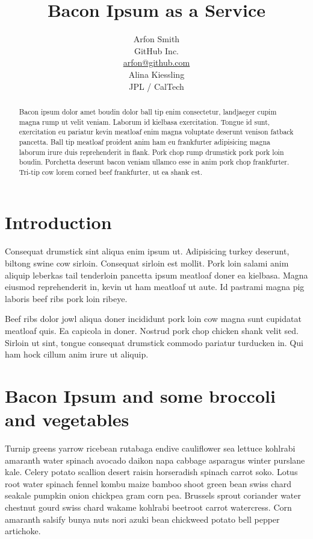 \documentclass[a4paper,10pt]{article}
\title{Bacon Ipsum as a Service \vspace{-0.2cm}}
\author{
Arfon Smith\\
GitHub Inc.\\
\url{arfon@github.com}\\
Alina Kiessling \\
JPL / CalTech
}
\date{}
\begin{document}
\maketitle

\vspace{-1.2cm}
\begin{abstract}

\noindent
Bacon ipsum dolor amet boudin dolor ball tip enim consectetur, landjaeger cupim magna rump ut velit veniam. Laborum id kielbasa exercitation. Tongue id sunt, exercitation eu pariatur kevin meatloaf enim magna voluptate deserunt venison fatback pancetta. Ball tip meatloaf proident anim ham eu frankfurter adipisicing magna laborum irure duis reprehenderit in flank. Pork chop rump drumstick pork pork loin boudin. Porchetta deserunt bacon veniam ullamco esse in anim pork chop frankfurter. Tri-tip cow lorem corned beef frankfurter, ut ea shank est.
\end{abstract}

\section{Introduction}

Consequat drumstick sint aliqua enim ipsum ut. Adipisicing turkey deserunt, biltong swine cow sirloin. Consequat sirloin est mollit. Pork loin salami anim aliquip leberkas tail tenderloin pancetta ipsum meatloaf doner ea kielbasa. Magna eiusmod reprehenderit in, kevin ut ham meatloaf ut aute. Id pastrami magna pig laboris beef ribs pork loin ribeye.

Beef ribs dolor jowl aliqua doner incididunt pork loin cow magna sunt cupidatat meatloaf quis. Ea capicola in doner. Nostrud pork chop chicken shank velit sed. Sirloin ut sint, tongue consequat drumstick commodo pariatur turducken in. Qui ham hock cillum anim irure ut aliquip.

\section{Bacon Ipsum and some broccoli and vegetables}

Turnip greens yarrow ricebean rutabaga endive cauliflower sea lettuce kohlrabi amaranth water spinach avocado daikon napa 
cabbage asparagus winter purslane kale. Celery potato scallion desert raisin horseradish spinach carrot soko. Lotus root 
water spinach fennel kombu maize bamboo shoot green bean swiss chard seakale pumpkin onion chickpea gram corn pea. 
Brussels sprout coriander water chestnut gourd swiss chard wakame kohlrabi beetroot carrot watercress. Corn amaranth 
salsify bunya nuts nori azuki bean chickweed potato bell pepper artichoke. 
\end{document}
